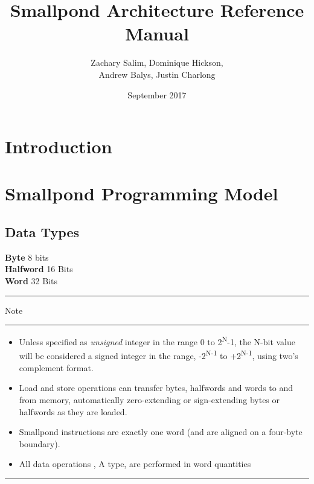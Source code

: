 \documentclass[12pt]{article}
\title{Smallpond Architecture Reference Manual}
\author{Zachary Salim, Dominique Hickson,\\ Andrew Balys, Justin Charlong}
\date{September 2017}
\begin{document}
\maketitle

\newpage
\tableofcontents

\newpage
\section{Introduction}

\newpage

\section{Smallpond Programming Model}
    \subsection{Data Types}
    \textbf{Byte} \hspace{2cm}8 bits\\
    \textbf{Halfword} \hspace{1.05cm}16 Bits\\
    \textbf{Word} \hspace{1.8cm}32 Bits\\
    
   \noindent\rule{1.5cm}{0.3pt}Note\rule{1.5cm}{0.3pt}
   
   \begin{itemize}
       \item Unless specified as \textit{unsigned} integer in the range 0 to 2\textsuperscript{N}-1, the N-bit value will be considered a signed integer in the range, -2\textsuperscript{N-1} to +2\textsuperscript{N-1}, using two's complement format.
       
       \item Load and store operations can transfer bytes, halfwords and words to and from memory,
        automatically zero-extending or sign-extending bytes or halfwords as they are loaded.

       \item Smallpond instructions are exactly one word (and are aligned on a four-byte boundary).
       
       \item All data operations , A type, are performed in word quantities
   \end{itemize}
   
   \noindent\rule{4cm}{0.3pt}
   \newpage
   
\end{document}
